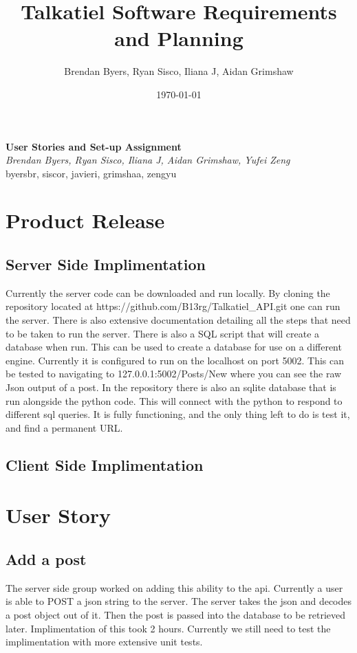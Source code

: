 \documentclass[12pt]{article}
\title{Talkatiel Software Requirements and Planning}
\author{Brendan Byers, Ryan Sisco, Iliana J, Aidan Grimshaw}
\date{\today}
\begin{document}
\begin{center}
      \Large\textbf{User Stories and Set-up Assignment}\\
      \large\textit{Brendan Byers, Ryan Sisco, Iliana J, Aidan Grimshaw, Yufei Zeng}\\
      \large{byersbr, siscor, javieri, grimshaa, zengyu}\\
   \end{center}

\tableofcontents
\section{Product Release}
   \subsection{Server Side Implimentation}
   Currently the server code can be downloaded and run locally.  By cloning the repository located at https://github.com/B13rg/Talkatiel_API.git one can run the server.  There is also extensive documentation detailing all the steps that need to be taken to run the server.  There is also a SQL script that will create a database when run.  This can be used to create a database for use on a different engine.  Currently it is configured to run on the localhost on port 5002.  This can be tested to navigating to 127.0.0.1:5002/Posts/New where you can see the raw Json output of a post.  In the repository there is also an sqlite database that is run alongside the python code.  This will connect with the python to respond to different sql queries.  It is fully functioning, and the only thing left to do is test it, and find a permanent URL.
   \subsection{Client Side Implimentation}
\section{User Story}
      \subsection{Add a post}
      The server side group worked on adding this ability to the api.  Currently a user is able to POST a json string to the server.  The server takes the json and decodes a post object out of it.  Then the post is passed into the database to be retrieved later.  Implimentation of this took 2 hours.  Currently we still need to test the implimentation with more extensive unit tests.      
\end{document}
